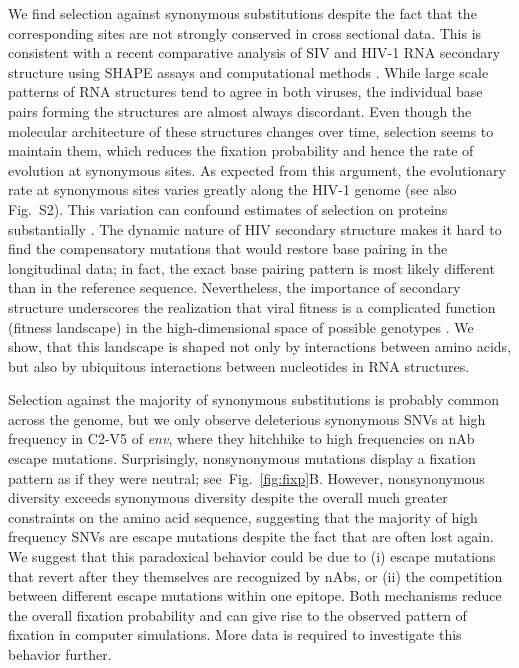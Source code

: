 \documentclass[11pt]{article}
\newcommand{\FIG}[1]{Fig.~\ref{fig:#1}}
\newcommand{\env}{\textit{env}}
\newcommand{\shankaregion}{C2-V5}
\newcommand{\syndiv}{2}
\begin{document}
We find selection against synonymous substitutions despite the
fact that the corresponding sites are not strongly conserved in
cross sectional data. This is consistent with a recent comparative
analysis of SIV and HIV-1 RNA secondary structure using SHAPE assays and
computational methods \citep{pollom_comparison_2013}. While large scale
patterns of RNA structures tend to agree in both viruses, the individual
base pairs forming the structures are almost always
discordant. Even though the molecular architecture of these structures
changes over time, selection seems to maintain them, which reduces the
fixation probability and hence the rate of evolution at synonymous
sites. As expected from this argument, the evolutionary rate
at synonymous sites varies greatly along the HIV-1 genome
\citep{mayrose_towards_2007} (see also Fig.~S\syndiv). This variation can confound estimates of
selection on proteins substantially \citep{ngandu_extensive_2008}. 
The dynamic nature of HIV secondary structure makes it hard to find the 
compensatory mutations that would restore base pairing in the
longitudinal data; in fact, the exact base pairing pattern is
most likely different than in the reference sequence. Nevertheless, the
importance of secondary structure underscores the realization that viral
fitness is a complicated function (fitness landscape) in the
high-dimensional space of possible genotypes
\citep{ferguson_translating_2013}. We show, that this landscape is shaped not
only by interactions between amino acids, but also by ubiquitous
interactions between nucleotides in RNA structures. 


Selection against the majority of synonymous substitutions is probably
common across the genome, but we only observe deleterious synonymous SNVs
at high frequency in \shankaregion{} of \env{}, where they hitchhike to
high frequencies on nAb escape mutations. Surprisingly, nonsynonymous
mutations display a fixation pattern as if they were neutral;
see~\FIG{fixp}B. However, nonsynonymous diversity exceeds
synonymous diversity despite the overall much greater constraints on the
amino acid sequence, suggesting that the majority of high frequency SNVs
are escape mutations despite the fact that are often lost again. We suggest that this
paradoxical behavior could be due to (i) escape
mutations that revert after they themselves are recognized by nAbs, or (ii)
the competition between different escape mutations within one epitope. 
Both mechanisms reduce the overall fixation probability and can
give rise to the observed pattern of fixation in computer
simulations. More data is required to investigate this behavior further.
\end{document}
